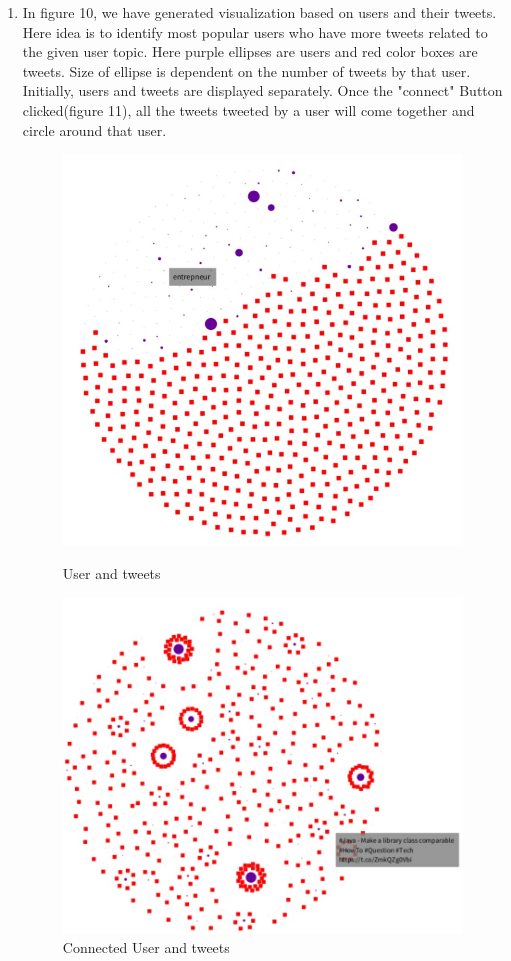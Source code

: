\documentclass[11pt]{article}
\begin{document}
\begin{enumerate}
\item In figure 10, we have generated visualization based on users and their tweets. Here idea is to identify most popular users who have more tweets related to the given user topic. Here purple ellipses are users and red color boxes are tweets. Size of ellipse is dependent on the number of tweets by that user. Initially, users and tweets are displayed separately. Once the "connect" Button clicked(figure 11), all the tweets tweeted by a user will come together and circle around that user.
\begin{figure}
\centering
\begin{minipage}{.5\textwidth}
\centering
\includegraphics[width=.8\linewidth]{UserTweet1.jpg}
  \caption{User and tweets}
\end{minipage}%
\begin{minipage}{.5\textwidth}
\centering
\includegraphics[width=.8\linewidth]{UserTweet2.jpg}
  \caption{Connected User and tweets}
\end{minipage}
\end{figure}


\end{enumerate}
\end{document}

